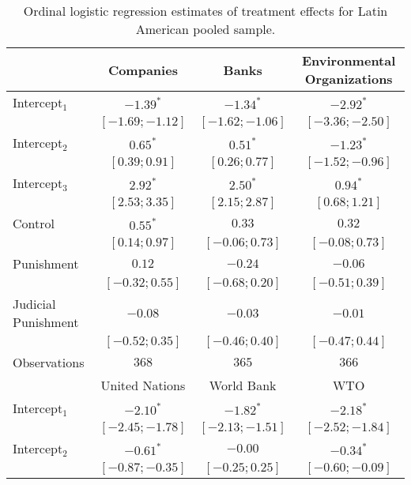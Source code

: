 \begin{table}[h]
\begin{center}
\caption{Ordinal logistic regression estimates of treatment effects for Latin American pooled sample.}
\begin{threeparttable}
\begin{tabular}{l c c c}
\hline
 & Companies & Banks & Environmental
Organizations \\
\hline
Intercept$_1$       & $-1.39^{*}$       & $-1.34^{*}$       & $-2.92^{*}$       \\
                    & $ [-1.69; -1.12]$ & $ [-1.62; -1.06]$ & $ [-3.36; -2.50]$ \\
Intercept$_2$       & $0.65^{*}$        & $0.51^{*}$        & $-1.23^{*}$       \\
                    & $ [ 0.39;  0.91]$ & $ [ 0.26;  0.77]$ & $ [-1.52; -0.96]$ \\
Intercept$_3$       & $2.92^{*}$        & $2.50^{*}$        & $0.94^{*}$        \\
                    & $ [ 2.53;  3.35]$ & $ [ 2.15;  2.87]$ & $ [ 0.68;  1.21]$ \\
Control             & $0.55^{*}$        & $0.33$            & $0.32$            \\
                    & $ [ 0.14;  0.97]$ & $ [-0.06;  0.73]$ & $ [-0.08;  0.73]$ \\
Punishment          & $0.12$            & $-0.24$           & $-0.06$           \\
                    & $ [-0.32;  0.55]$ & $ [-0.68;  0.20]$ & $ [-0.51;  0.39]$ \\
Judicial Punishment & $-0.08$           & $-0.03$           & $-0.01$           \\
                    & $ [-0.52;  0.35]$ & $ [-0.46;  0.40]$ & $ [-0.47;  0.44]$ \\
\hline
Observations        & $368$             & $365$             & $366$             \\
\hline
 & United Nations & World Bank & WTO \\
\hline
Intercept$_1$       & $-2.10^{*}$       & $-1.82^{*}$       & $-2.18^{*}$       \\
                    & $ [-2.45; -1.78]$ & $ [-2.13; -1.51]$ & $ [-2.52; -1.84]$ \\
Intercept$_2$       & $-0.61^{*}$       & $-0.00$           & $-0.34^{*}$       \\
                    & $ [-0.87; -0.35]$ & $ [-0.25;  0.25]$ & $ [-0.60; -0.09]$ \\

\end{tabular}
\end{threeparttable}
\end{center}
\end{table}
